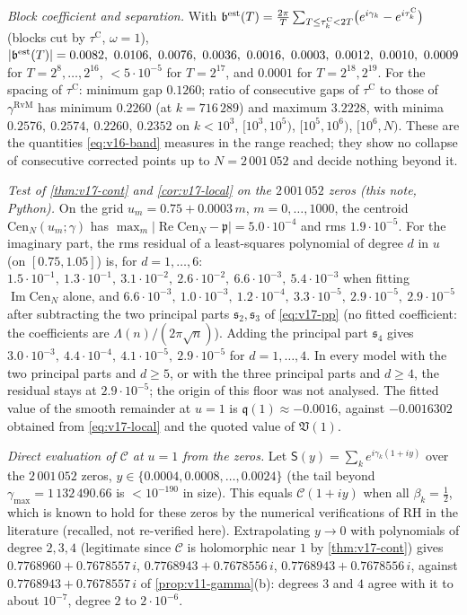 \documentclass[11pt,a4paper]{article}
\numberwithin{equation}{section}
\theoremstyle{definition}
\theoremstyle{remark}
\begin{document}
\emph{Block coefficient and separation.} With $\mathfrak b^{\rm est}(T)=\frac{2\pi}T\sum_{T\le\tau_k^{\mathrm C}<2T}\bigl(e^{i\gamma_k}-e^{i\tau_k^{\mathrm C}}\bigr)$ (blocks cut by $\tau^{\mathrm C}$, $\omega=1$), $|\mathfrak b^{\rm est}(T)|=0.0082,\ 0.0106,\ 0.0076,\ 0.0036,\ 0.0016,\ 0.0003,\ 0.0012,\ 0.0010,\ 0.0009$ for $T=2^8,\dots,2^{16}$, $<5\cdot10^{-5}$ for $T=2^{17}$, and $0.0001$ for $T=2^{18},2^{19}$. For the spacing of $\tau^{\mathrm C}$: minimum gap $0.1260$; ratio of consecutive gaps of $\tau^{\mathrm C}$ to those of $\gamma^{\mathrm{RvM}}$ has minimum $0.2260$ (at $k=716\,289$) and maximum $3.2228$, with minima $0.2576,\ 0.2574,\ 0.2260,\ 0.2352$ on $k<10^3$, $[10^3,10^5)$, $[10^5,10^6)$, $[10^6,N)$. These are the quantities \eqref{eq:v16-band} measures in the range reached; they show no collapse of consecutive corrected points up to $N=2\,001\,052$ and decide nothing beyond it.

\emph{Test of \cref{thm:v17-cont} and \cref{cor:v17-local} on the $2\,001\,052$ zeros (this note, Python).} On the grid $u_m=0.75+0.0003\,m$, $m=0,\dots,1000$, the centroid $\mathrm{Cen}_N(u_m;\gamma)$ has $\max_m|\operatorname{Re}\mathrm{Cen}_N-\mathfrak p|=5.0\cdot10^{-4}$ and rms $1.9\cdot10^{-5}$. For the imaginary part, the rms residual of a least-squares polynomial of degree $d$ in $u$ (on $[0.75,1.05]$) is, for $d=1,\dots,6$: $1.5\cdot10^{-1},\ 1.3\cdot10^{-1},\ 3.1\cdot10^{-2},\ 2.6\cdot10^{-2},\ 6.6\cdot10^{-3},\ 5.4\cdot10^{-3}$ when fitting $\operatorname{Im}\mathrm{Cen}_N$ alone, and $6.6\cdot10^{-3},\ 1.0\cdot10^{-3},\ 1.2\cdot10^{-4},\ 3.3\cdot10^{-5},\ 2.9\cdot10^{-5},\ 2.9\cdot10^{-5}$ after subtracting the two principal parts $\mathfrak s_2,\mathfrak s_3$ of \eqref{eq:v17-pp} (no fitted coefficient: the coefficients are $\Lambda(n)/(2\pi\sqrt n)$). Adding the principal part $\mathfrak s_4$ gives $3.0\cdot10^{-3},\ 4.4\cdot10^{-4},\ 4.1\cdot10^{-5},\ 2.9\cdot10^{-5}$ for $d=1,\dots,4$. In every model with the two principal parts and $d\ge5$, or with the three principal parts and $d\ge4$, the residual stays at $2.9\cdot10^{-5}$; the origin of this floor was not analysed. The fitted value of the smooth remainder at $u=1$ is $\mathfrak q(1)\approx-0.0016$, against $-0.0016302$ obtained from \eqref{eq:v17-local} and the quoted value of $\mathfrak V(1)$.

\emph{Direct evaluation of $\mathscr C$ at $u=1$ from the zeros.} Let $\mathsf S(y)=\sum_{k}e^{i\gamma_k(1+iy)}$ over the $2\,001\,052$ zeros, $y\in\{0.0004,0.0008,\dots,0.0024\}$ (the tail beyond $\gamma_{\max}=1\,132\,490.66$ is $<10^{-190}$ in size). This equals $\mathscr C(1+iy)$ when all $\beta_k=\frac12$, which is known to hold for these zeros by the numerical verifications of RH in the literature (recalled, not re-verified here). Extrapolating $y\to0$ with polynomials of degree $2,3,4$ (legitimate since $\mathscr C$ is holomorphic near $1$ by \cref{thm:v17-cont}) gives $0.7768960+0.7678557\,i$, $0.7768943+0.7678556\,i$, $0.7768943+0.7678556\,i$, against $0.7768943+0.7678557\,i$ of \cref{prop:v11-gamma}(b): degrees $3$ and $4$ agree with it to about $10^{-7}$, degree $2$ to $2\cdot10^{-6}$.
\end{document}
